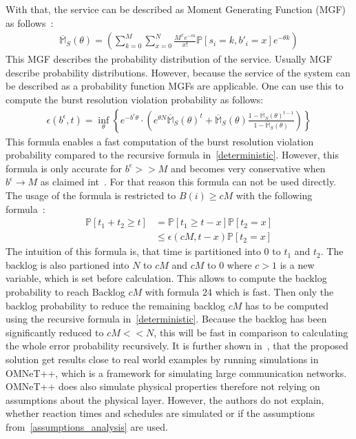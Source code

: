 \documentclass[conference]{IEEEtran}
\begin{document}
With that, the service can be described as Moment Generating Function (MGF) as follows~\cite{8422323}:
\begin{align}
    \overline{\mathds{M}}_S(\theta) = \left(\sum_{k = 0}^{M}\sum_{x =0}^{N}\frac{M^xe^{-m}}{x!}\mathds{P}[s_i = k, b'_i = x]e^{-\theta k}  \right)
\end{align}
This MGF describes the probability distribution of the service.
Usually MGF describe probability distributions.
However, because the service of the system can be described as a probability function MGFs are applicable.
One can use this to compute the burst resolution violation probability as follows:
\begin{align}
    \epsilon(b^\epsilon, t) = \inf_{\theta}\left\{e^{-b^\epsilon \theta} \cdot (e^{\theta N}\overline{\mathds{M}}_S(\theta)^t+\overline{\mathds{M}}_S(\theta)\frac{1-\overline{\mathds{M}}_S(\theta)^{t-1}}{1-\overline{\mathds{M}}_S(\theta)})\right\}
\end{align}
This formula enables a fast computation of the burst resolution violation probability compared to the recursive formula in~\ref{deterministic}.
However, this formula is only accurate for $b^\epsilon>>M$ and becomes very conservative when $b^\epsilon\rightarrow M$ as claimed int~\cite{8422323}.
For that reason this formula can not be used directly.
The usage of the formula is restricted to $B(i) \geq cM$ with the following formula~\cite{8422323}:
\begin{align}
    \mathds{P}[t_1+t_2\geq t]&= \mathds{P}[t_1\geq t-x]\mathds{P}[t_2 = x]\\
    &\leq \epsilon(cM, t-x) \mathds{P}[t_2 = x]
\end{align}
The intuition of this formula is, that time is partitioned into 0 to $t_1$ and $t_2$.
The backlog is also partioned into $N$ to $cM$ and $cM$ to $0$ where $c >1$ is a new variable, which is set before calculation.
This allows to compute the backlog probability to reach Backlog $cM$ with formula 24 which is fast.
Then only the backlog probability to reduce the remaining backlog $cM$ has to be computed using the recursive formula in~\ref{deterministic}.
Because the backlog has been significantly reduced to $cM << N$, this will be fast in comparison to calculating the whole error probability recursively.
It is further shown in~\cite{8422323}, that the proposed solution get results close to real world examples by running simulations in OMNeT++, which is a framework for simulating large communication networks.
OMNeT++ does also simulate physical properties therefore not relying on assumptions about the physical layer.
However, the authors do not explain, whether reaction times and schedules are simulated or if the assumptions from~\ref{assumptions_analysis} are used.
\end{document}
